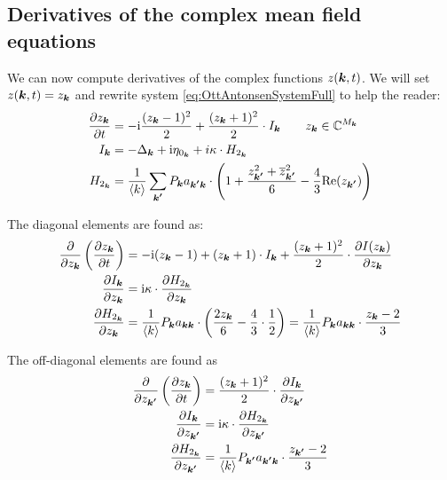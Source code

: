 \subsection{Derivatives of the complex mean field equations}
We can now compute derivatives of the complex functions $z({\boldsymbol{k}},t)$. We will set $z({\boldsymbol{k}}, t) = z_{{\boldsymbol{k}}}$ and rewrite system \eqref{eq:OttAntonsenSystemFull} to help the reader:
\begin{align}
\frac{\partial z_{{\boldsymbol{k}}}}{\partial t} &= -{\rm{i}} \frac{(z_{{\boldsymbol{k}}}-1)^{2}}{2} + \frac{(z_{{\boldsymbol{k}}}+1)^{2}}{2} \cdot I_{{\boldsymbol{k}}} \qquad z_{{\boldsymbol{k}}} \in {\mathbb{C}}^{M_{\boldsymbol{k}}} \nonumber \\
I_{{\boldsymbol{k}}} &= -\Delta_{{\boldsymbol{k}}} + {\rm{i}} \eta_{0_{{\boldsymbol{k}}}} + i \kappa \cdot H_{2_{{\boldsymbol{k}}}} \label{eq:OttAntonsenSystemFull_k} \\
H_{2_{{\boldsymbol{k}}}} &= \frac{1}{{\langle k\rangle}} \sum_{{\boldsymbol{k'}}} P_{{\boldsymbol{k}}} a_{{\boldsymbol{k'}} {\boldsymbol{k}}} \cdot \left( 1 + \frac{z_{{\boldsymbol{k'}}}^2 + \overline{z}_{{\boldsymbol{k'}}}^2}{6} - \frac{4}{3} {\operatorname{Re}}(z_{{\boldsymbol{k'}}}) \right) \nonumber
\end{align}

The diagonal elements are found as:
\begin{equation}
\begin{aligned}[b]
\frac{\partial}{\partial z_{{\boldsymbol{k}}}}\left(\frac{\partial z_{{\boldsymbol{k}}}}{\partial t} \right) &= - {\rm{i}}(z_{{\boldsymbol{k}}} - 1) + (z_{{\boldsymbol{k}}} + 1) \cdot I_{{\boldsymbol{k}}} +  \frac{(z_{{\boldsymbol{k}}}+1)^{2}}{2} \cdot \frac{\partial I(z_{{\boldsymbol{k}}})}{\partial z_{{\boldsymbol{k}}}} \\
\frac{\partial I_{{\boldsymbol{k}}}}{\partial z_{{\boldsymbol{k}}}} &= {\rm{i}} \kappa \cdot \frac{\partial H_{2_{{\boldsymbol{k}}}}}{\partial z_{{\boldsymbol{k}}}} \\
\frac{\partial H_{2_{{\boldsymbol{k}}}}}{\partial z_{{\boldsymbol{k}}}} &= \frac{1}{{\langle k\rangle}} P_{{\boldsymbol{k}}} a_{{\boldsymbol{k}} {\boldsymbol{k}}} \cdot \left(\frac{2 z_{{\boldsymbol{k}}}}{6} - \frac{4}{3} \cdot \frac{1}{2} \right) = \frac{1}{{\langle k\rangle}} P_{{\boldsymbol{k}}} a_{{\boldsymbol{k}} {\boldsymbol{k}}} \cdot\frac{z_{{\boldsymbol{k}}} - 2}{3}
\end{aligned}
\label{eq:OttAntonsenSystemJacobianDiagonal}
\end{equation}

The off-diagonal elements are found as
\begin{equation}
\begin{aligned}[b]
\frac{\partial}{\partial z_{{\boldsymbol{k'}}}}\left(\frac{\partial z_{{\boldsymbol{k}}}}{\partial t} \right) &= \frac{(z_{{\boldsymbol{k}}} + 1)^{2}}{2} \cdot \frac{\partial I_{{\boldsymbol{k}}}}{\partial z_{{\boldsymbol{k'}}}} \\
\frac{\partial I_{{\boldsymbol{k}}}}{\partial z_{{\boldsymbol{k'}}}} &= {\rm{i}} \kappa \cdot \frac{\partial H_{2_{{\boldsymbol{k}}}}}{\partial z_{{\boldsymbol{k'}}}} \\
\frac{\partial H_{2_{{\boldsymbol{k}}}}}{\partial z_{{\boldsymbol{k'}}}} &= \frac{1}{{\langle k\rangle}} P_{{\boldsymbol{k'}}} a_{{\boldsymbol{k'}} {\boldsymbol{k}}} \cdot \frac{z_{{\boldsymbol{k'}}} - 2}{3}
\end{aligned}
\label{eq:OttAntonsenSystemJacobianOffDiagonal}
\end{equation}


